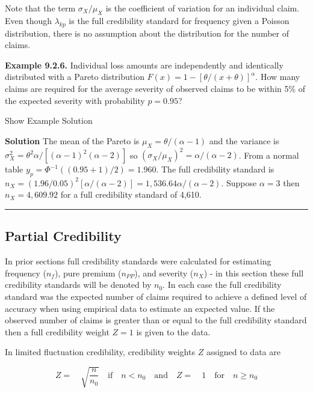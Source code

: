 \documentclass[]{book}
\theoremstyle{definition}
\theoremstyle{definition}
\theoremstyle{definition}
\theoremstyle{remark}
\begin{document}
Note that the term \(\sigma_X/\mu_X\) is the coefficient of variation
for an individual claim. Even though \(\lambda_{kp}\) is the full
credibility standard for frequency given a Poisson distribution, there
is no assumption about the distribution for the number of claims.

\textbf{Example 9.2.6.} Individual loss amounts are independently and
identically distributed with a Pareto distribution
\(F(x)=1-[\theta/(x+\theta)]^{\alpha}\). How many claims are required
for the average severity of observed claims to be within 5\(\%\) of the
expected severity with probability \(p=0.95\)?

Show Example Solution

\hypertarget{toggleExampleCred.2.6}{}
\textbf{Solution} The mean of the Pareto is \(\mu_X=\theta/(\alpha-1)\)
and the variance is
\(\sigma_X^2=\theta^{2}\alpha/[(\alpha-1)^{2}(\alpha-2)]\) so
\((\sigma_X/\mu_X)^2=\alpha/(\alpha-2)\). From a normal table
\(y_p=\Phi^{-1}((0.95+1)/2)=1.960\). The full credibility standard is
\(n_X=(1.96/0.05)^{2}[\alpha/(\alpha-2)]=1,536.64\alpha/(\alpha-2)\).
Suppose \(\alpha=3\) then \(n_X=4,609.92\) for a full credibility
standard of 4,610.

\begin{center}\rule{0.5\linewidth}{\linethickness}\end{center}

\subsection{Partial Credibility}\label{partial-credibility}

In prior sections full credibility standards were calculated for
estimating frequency (\(n_f\)), pure premium (\(n_{PP}\)), and severity
(\(n_X\)) - in this section these full credibility standards will be
denoted by \(n_{0}\). In each case the full credibility standard was the
expected number of claims required to achieve a defined level of
accuracy when using empirical data to estimate an expected value. If the
observed number of claims is greater than or equal to the full
credibility standard then a full credibility weight \(Z=1\) is given to
the data.

In limited fluctuation credibility, credibility weights \(Z\) assigned
to data are

\begin{equation*} 
Z=\quad \sqrt{\frac{n}{n_{0}}} \quad \textrm{if} \quad   n < n_{0} \quad \textrm{and}  \quad Z=\quad 1 \quad \textrm{for} \quad   n \geq n_{0}
\end{equation*}
\end{document}
